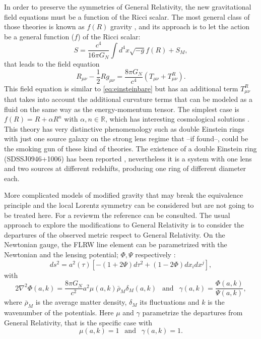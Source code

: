 In order to preserve the symmetries of General Relativity, the new gravitational field equations must be a function of the Ricci scalar. The most general class of those theories is known as $f(R)$ gravity \cite{2010LRR....13....3D,2010RvMP...82..451S}, and its approach is to let the action be a general function ($f$) of the Ricci scalar:
\begin{equation}
S = \frac{c^4}{16\pi G_N}\int d^4x\sqrt{-g}f(R)+S_M,
\end{equation}
that leads to the field equation
\begin{equation}
R_{\mu\nu}-\frac{1}{2}Rg_{\mu\nu}=\frac{8\pi G_N}{c^4}( T_{\mu\nu}+T_{\mu\nu}^R).
\end{equation}
This field equation is similar to \autoref{eq:einsteinbare} but has an additional term $T_{\mu\nu}^R$ that takes into account the additional curvature terms that can be modeled as a fluid on the same way as the energy-momentum tensor. The simplest case is $f(R) =R+\alpha R^n$ with $\alpha,n\in\mathbb{R}$, which has interesting cosmological solutions \cite{PhysRevD.85.083511}. This theory has very distinctive phenomenology such as double Einstein rings with just one source galaxy on the strong lens regime \cite{2011PhRvD..83b4030N} that --if found--, could be the smoking gun of these kind of theories. The existence of a double Einstein ring (SDSSJ0946+1006) has been reported \cite{2008ApJ...677.1046G}, nevertheless it is a system with one lens and two sources at different redshifts, producing one ring of different diameter each.
\newline

More complicated models of modified gravity that may break the equivalence principle and the local Lorentz symmetry can be considered but are not going to be treated here. For a reviewm the reference \cite{2015CQGra..32x3001B} can be consulted. The usual approach to explore the modifications to General Relativity \cite{2015PhRvD..91h3504L} is to consider the departures of the observed metric respect to General Relativity. On the Newtonian gauge, the FLRW line element can be parametrized with the Newtonian and the lensing potential; $\Phi,\Psi$ respectively \cite{2015PhRvD..91h3504L}:
\begin{equation}
ds^2 = a^2(\tau)[-(1+2\Psi)d\tau^2+(1-2\Phi)dx_idx^j],
\end{equation}
with
\begin{equation}
2\nabla^2\Phi(a,k) = \frac{8\pi G_N}{c^2}a^2\mu(a,k)\bar \rho_M\delta_M(a,k)\ \ \mbox{ and }\ \ \gamma(a,k)=\frac{\Phi(a,k)}{\Psi(a,k)},
\end{equation}
where $\bar \rho_M$ is the average matter density, $\delta_M$ its fluctuations and $k$ is the wavenumber of the potentials. Here $\mu$ and $\gamma$ parametrize the departures from General Relativity, that is the specific case with
\begin{equation}
\mu(a,k) = 1\ \ \mbox{ and }\ \ \gamma(a,k) = 1.
\end{equation}

